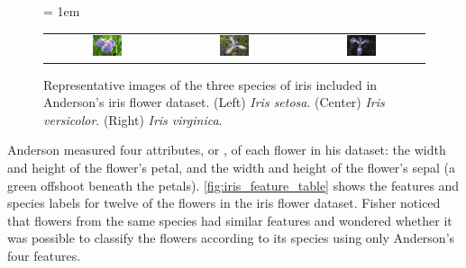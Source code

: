 \begin{figure}[h]
\centering
\tabcolsep = 1em
\mySfFamily
\begin{tabular}{c c c}
\includegraphics[width = 0.25\textwidth]{../images/Iris_setosa_2.jpg} & \includegraphics[width = 0.25\textwidth]{../images/Iris_versicolor.jpg} & \includegraphics[width = 0.25\textwidth]{../images/Iris_virginica.jpg}
\end{tabular}
\caption{Representative images of the three species of iris included in Anderson's iris flower dataset. (Left) \textit{Iris setosa}. (Center)  \textit{Iris versicolor}. (Right) \textit{Iris virginica}.}
\label{fig:iris_flowers}
\end{figure}

Anderson measured four attributes, or , of each flower in his dataset: the width and height of the flower's petal, and the width and height of the flower's sepal (a green offshoot beneath the petals). \autoref{fig:iris_feature_table} shows the features and species labels for twelve of the flowers in the iris flower dataset. Fisher noticed that flowers from the same species had similar features and wondered whether it was possible to classify the flowers according to its species using only Anderson's four features.\\



